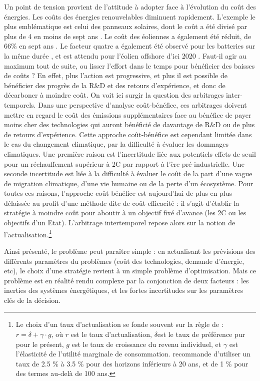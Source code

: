 Un point de tension provient de l’attitude à adopter face à l’évolution du coût des énergies. Les coûts des énergies renouvelables diminuent rapidement. L’exemple le plus emblématique est celui des panneaux solaires, dont le coût a été divisé par plus de 4 en moins de sept ans \citep{Lazard2016}. Le coût des éoliennes a également été réduit, de 66\% en sept ans \citep{Lazard2016}. Le facteur quatre a également été observé pour les batteries sur la même durée \citep{McKinsey2017EV}, et est attendu pour l’éolien offshore d’ici 2020 \citep{McKinsey2017Wind}. Faut-il agir au maximum tout de suite, ou lisser l’effort dans le temps pour bénéficier des baisses de coûts ? En effet, plus l’action est progressive, et plus il est possible de bénéficier des progrès de la R\&D et des retours d’expérience, et donc de décarboner à moindre coût.
On voit ici surgir la question des arbitrages inter-temporels. Dans une perspective d’analyse coût-bénéfice, ces arbitrages doivent mettre en regard le coût des émissions supplémentaires face au bénéfice de payer moins cher des technologies qui auront bénéficié de davantage de R\&D ou de plus de retours d’expérience. Cette approche coût-bénéfice est cependant limitée dans le cas du changement climatique, par la difficulté à évaluer les dommages climatiques. Une première raison est l’incertitude liée aux potentiels effets de seuil pour un réchauffement supérieur à 2\degree C par rapport à l'ère pré-industrielle. Une seconde incertitude est liée à la difficulté à évaluer le coût de la part d’une vague de migration climatique, d’une vie humaine ou de la perte d’un écosystème. 
Pour toutes ces raisons, l’approche coût-bénéfice est aujourd’hui de plus en plus délaissée au profit d’une méthode dite de coût-efficacité : il s’agit d’établir la stratégie à moindre coût pour aboutir à un objectif fixé d’avance (les 2\degree C ou les objectifs d’un Etat). L’arbitrage intertemporel repose alors sur la notion de l’actualisation.\footnote{Le choix d’un taux d’actualisation se fonde souvent sur la règle de \citet{Ramsey1928} : $r = \delta + \gamma \cdot g$,
où $r$ est le taux d’actualisation, $\delta$est le taux de préférence pur pour le présent, $g$ est le taux de croissance du revenu individuel, et $\gamma$ est l’élasticité de l’utilité marginale de consommation. \citet{Gollier2011} recommande d’utiliser un taux de 2.5 \% à 3.5 \% pour des horizons inférieurs à 20 ans, et de 1 \% pour des termes au-delà de 100 ans. 
} 

Ainsi présenté, le problème peut paraître simple : en actualisant les prévisions des différents paramètres du problèmes (coût des technologies, demande d’énergie, etc), le choix d’une stratégie revient à un simple problème d’optimisation. 
Mais ce problème est en réalité rendu complexe par la conjonction de deux facteurs : les inerties des systèmes énergétiques, et les fortes incertitudes sur les paramètres clés de la décision.

